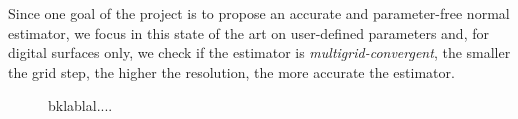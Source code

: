 
Since one goal of the project is to propose an accurate and parameter-free normal estimator,
we focus in this state of the art on user-defined parameters and, for digital surfaces only,
we check if the estimator is \emph{multigrid-convergent}, \ie the smaller the grid step,
the higher the resolution, the more accurate the estimator. 

\begin{figure}[htbp]
  \centering
  \caption{bklablal....}
  \label{fig:multi}
\end{figure}






